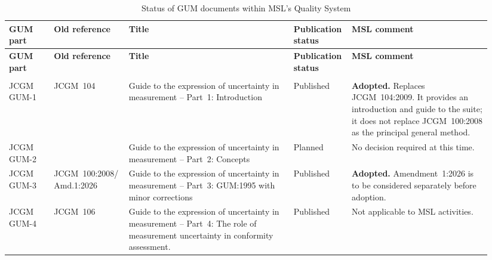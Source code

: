 \begin{landscape}

\small
\setlength{\tabcolsep}{3.5pt}
\renewcommand{\arraystretch}{1.35}

\begin{longtable}{|
  >{\RaggedRight\arraybackslash}p{0.095\linewidth}|
  >{\RaggedRight\arraybackslash}p{0.125\linewidth}|
  >{\RaggedRight\arraybackslash}p{0.335\linewidth}|
  >{\RaggedRight\arraybackslash}p{0.105\linewidth}|
  >{\RaggedRight\arraybackslash}p{0.285\linewidth}|}

\caption{Status of GUM documents within MSL's Quality System}
\label{tab:gum-status}\\

\hline
\rowcolor{black!15}
\textbf{GUM part} &
\textbf{Old reference} &
\textbf{Title} &
\textbf{Publication status} &
\textbf{MSL comment} \\
\hline
\endfirsthead

\hline
\rowcolor{black!15}
\textbf{GUM part} &
\textbf{Old reference} &
\textbf{Title} &
\textbf{Publication status} &
\textbf{MSL comment} \\
\hline
\endhead

\hline
\multicolumn{5}{r}{\footnotesize Continued on the following page} \\
\hline
\endfoot

\hline
\endlastfoot

JCGM GUM-1 &
JCGM~104 &
Guide to the expression of uncertainty in measurement -- Part~1: Introduction &
Published &
\textbf{Adopted.} Replaces JCGM~104:2009. It provides an introduction and guide to the suite; it does not replace JCGM~100:2008 as the principal general method. \\
\hline

JCGM GUM-2 &
&
Guide to the expression of uncertainty in measurement -- Part~2: Concepts &
Planned &
No decision required at this time. \\
\hline

JCGM GUM-3 &
JCGM~100:2008/\newline
Amd.1:2026 &
Guide to the expression of uncertainty in measurement -- Part~3: GUM:1995 with minor corrections &
Published &
\textbf{Adopted.} Amendment~1:2026 is to be considered separately before adoption. \\
\hline

JCGM GUM-4 &
JCGM~106 &
Guide to the expression of uncertainty in measurement -- Part~4: The role of measurement uncertainty in conformity assessment. &
Published &
Not applicable to MSL activities. \\
\hline


\end{longtable}
\end{landscape}

